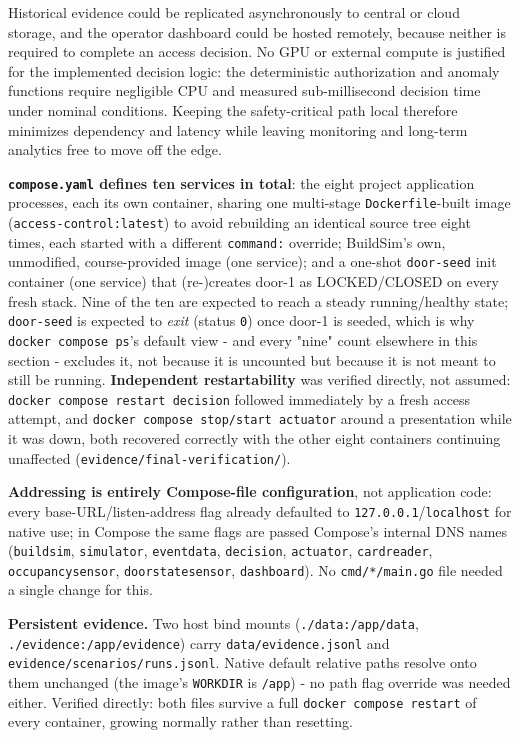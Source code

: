 \documentclass[11pt]{article}
\begin{document}
Historical evidence could be replicated asynchronously to central or
cloud storage, and the operator dashboard could be hosted remotely,
because neither is required to complete an access decision. No GPU or
external compute is justified for the implemented decision logic: the
deterministic authorization and anomaly functions require negligible
CPU and measured sub-millisecond decision time under nominal conditions.
Keeping the safety-critical path local therefore minimizes dependency
and latency while leaving monitoring and long-term analytics free to
move off the edge.

\textbf{\texttt{compose.yaml} defines ten services in total}: the eight
project application processes, each its own container, sharing one
multi-stage \texttt{Dockerfile}-built image (\texttt{access-control:latest})
to avoid rebuilding an identical source tree eight times, each started
with a different \texttt{command:} override; BuildSim's own, unmodified,
course-provided image (one service); and a one-shot \texttt{door-seed}
init container (one service) that (re-)creates door-1 as LOCKED/CLOSED
on every fresh stack. Nine
of the ten are expected to reach a steady running/healthy state;
\texttt{door-seed} is expected to \emph{exit} (status \texttt{0}) once
door-1 is seeded, which is why \texttt{docker compose ps}'s default view
- and every "nine" count elsewhere in this section - excludes it, not
because it is uncounted but because it is not meant to still be running.
\textbf{Independent restartability} was verified directly, not assumed:
\texttt{docker compose restart decision} followed immediately by a fresh
access attempt, and \texttt{docker compose stop/start actuator} around a
presentation while it was down, both recovered correctly with the other
eight containers continuing unaffected (\texttt{evidence/final-verification/}).

\textbf{Addressing is entirely Compose-file configuration}, not
application code: every base-URL/listen-address flag already defaulted
to \texttt{127.0.0.1}/\texttt{localhost} for native use; in Compose the
same flags are passed Compose's internal DNS names
(\texttt{buildsim}, \texttt{simulator}, \texttt{eventdata},
\texttt{decision}, \texttt{actuator}, \texttt{cardreader},
\texttt{occupancysensor}, \texttt{doorstatesensor}, \texttt{dashboard}).
No \texttt{cmd/*/main.go} file needed a single change for this.

\textbf{Persistent evidence.} Two host bind mounts
(\texttt{./data:/app/data}, \texttt{./evidence:/app/evidence}) carry
\texttt{data/evidence.jsonl} and \texttt{evidence/scenarios/runs.jsonl}.
Native default relative paths resolve onto them unchanged (the image's
\texttt{WORKDIR} is \texttt{/app}) - no path flag override was needed
either. Verified directly: both files survive a full
\texttt{docker compose restart} of every container, growing normally
rather than resetting.
\end{document}
